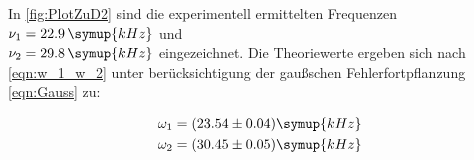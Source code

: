 In \autoref{fig:PlotZuD2} sind die experimentell ermittelten Frequenzen $\nu_1 = 22.9 \, \symup{kHz}$ und \\ $\nu_2 = 29.8 \, \symup{kHz}$ eingezeichnet.
Die Theoriewerte ergeben sich nach \eqref{eqn:w_1_w_2} unter berücksichtigung der gaußschen Fehlerfortpflanzung \eqref{eqn:Gauss} zu:

\begin{align*}
  \omega_1 &= (23.54 \pm 0.04) \symup{kHz} \\
  \omega_2 &= (30.45 \pm 0.05) \symup{kHz}
\end{align*}

\cite{uncertainties}

